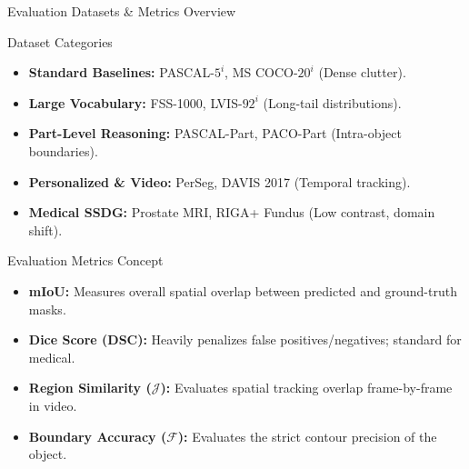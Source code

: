 \documentclass[aspectratio=169, 10pt]{beamer}
\begin{document}
\begin{frame}{Evaluation Datasets \& Metrics Overview}
    \begin{block}{Dataset Categories}
        \begin{itemize}
            \item \textbf{Standard Baselines:} PASCAL-$5^i$, MS COCO-$20^i$ (Dense clutter).
            \item \textbf{Large Vocabulary:} FSS-1000, LVIS-$92^i$ (Long-tail distributions).
            \item \textbf{Part-Level Reasoning:} PASCAL-Part, PACO-Part (Intra-object boundaries).
            \item \textbf{Personalized \& Video:} PerSeg, DAVIS 2017 (Temporal tracking).
            \item \textbf{Medical SSDG:} Prostate MRI, RIGA+ Fundus (Low contrast, domain shift).
        \end{itemize}
    \end{block}
    
    \begin{block}{Evaluation Metrics Concept}
        \begin{itemize}
            \item \textbf{mIoU:} Measures overall spatial overlap between predicted and ground-truth masks.
            \item \textbf{Dice Score (DSC):} Heavily penalizes false positives/negatives; standard for medical.
            \item \textbf{Region Similarity ($\mathcal{J}$):} Evaluates spatial tracking overlap frame-by-frame in video.
            \item \textbf{Boundary Accuracy ($\mathcal{F}$):} Evaluates the strict contour precision of the object.
        \end{itemize}
    \end{block}
\end{frame}
\end{document}
